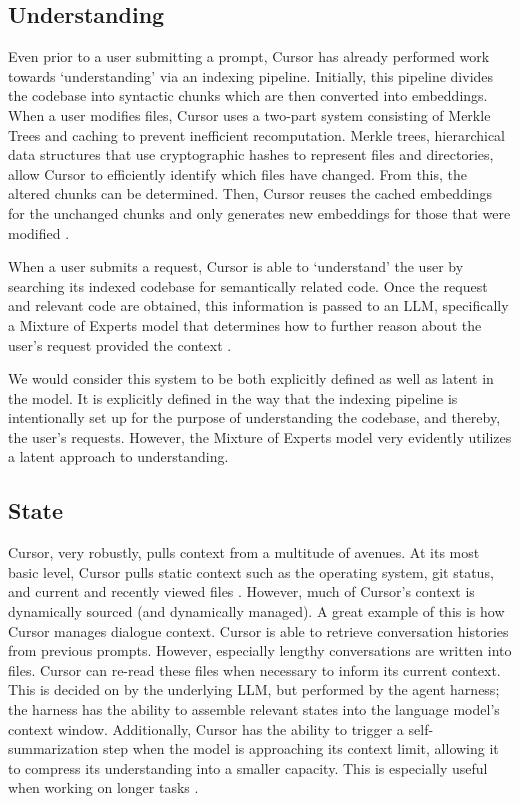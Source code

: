 \documentclass[11pt]{article}
\begin{document}
\subsection{Understanding}

Even prior to a user submitting a prompt, Cursor has already performed work towards ‘understanding’ via an indexing pipeline. Initially, this pipeline divides the codebase into syntactic chunks which are then converted into embeddings. When a user modifies files, Cursor uses a two-part system consisting of Merkle Trees and caching to prevent inefficient recomputation. Merkle trees, hierarchical data structures that use cryptographic hashes to represent files and directories, allow Cursor to efficiently identify which files have changed. From this, the altered chunks can be determined. Then, Cursor reuses the cached embeddings for the unchanged chunks and only generates new embeddings for those that were modified \citep{cursor2025semantic}. 

When a user submits a request, Cursor is able to ‘understand’ the user by searching its indexed codebase for semantically related code. Once the request and relevant code are obtained, this information is passed to an LLM, specifically a Mixture of Experts model that determines how to further reason about the user’s request provided the context \citep{cursor2025composer}. 

We would consider this system to be both explicitly defined as well as latent in the model. It is explicitly defined in the way that the indexing pipeline is intentionally set up for the purpose of understanding the codebase, and thereby, the user’s requests. However, the Mixture of Experts model very evidently utilizes a latent approach to understanding.


\subsection{State}

Cursor, very robustly, pulls context from a multitude of avenues. At its most basic level, Cursor pulls static context such as the operating system, git status, and current and recently viewed files \citep{heule2026harness}. However, much of Cursor’s context is dynamically sourced (and dynamically managed). A great example of this is how Cursor manages dialogue context. Cursor is able to retrieve conversation histories from previous prompts. However, especially lengthy conversations are written into files. Cursor can re-read these files when necessary to inform its current context. This is decided on by the underlying LLM, but performed by the agent harness; the harness has the ability to assemble relevant states into the language model’s context window. \citep{katz2026dynamic} Additionally, Cursor has the ability to trigger a self-summarization step when the model is approaching its context limit, allowing it to compress its understanding into a smaller capacity. This is especially useful when working on longer tasks \citep{cursor2026composer1.5}.
\end{document}
